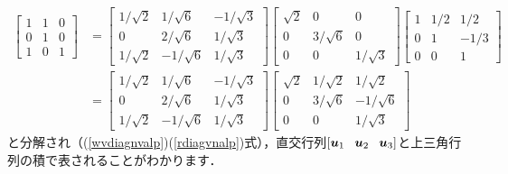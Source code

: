\documentclass[dvipdfmx]{jsarticle}
\theoremstyle{definition}
\newcommand{\hs}[1]{\hspace{#1em}}
\newcommand{\hv}[3]{[#1 \hs{0.8} #2 \hs{0.8} #3]}
\begin{document}
\begin{align}
    \begin{bmatrix}
        1 & 1 & 0 \\
        0 & 1 & 0 \\
        1 & 0 & 1
    \end{bmatrix}
    &= \begin{bmatrix}
        1/\sqrt{2} & 1/\sqrt{6} & -1/\sqrt{3} \\
        0 & 2/\sqrt{6} & 1/\sqrt{3} \\
        1/\sqrt{2} & -1/\sqrt{6} & 1/\sqrt{3}
    \end{bmatrix}
    \begin{bmatrix}
        \sqrt{2} & 0 & 0 \\
        0 & 3/\sqrt{6} & 0 \\
        0 & 0 & 1/\sqrt{3}
    \end{bmatrix}
    \begin{bmatrix}
        1 & 1/2 & 1/2 \\
        0 & 1 & -1/3 \\
        0 & 0 & 1
    \end{bmatrix} \\
    &= \begin{bmatrix}
        1/\sqrt{2} & 1/\sqrt{6} & -1/\sqrt{3} \\
        0 & 2/\sqrt{6} & 1/\sqrt{3} \\
        1/\sqrt{2} & -1/\sqrt{6} & 1/\sqrt{3}
    \end{bmatrix}
    \begin{bmatrix}
        \sqrt{2} & 1/\sqrt{2} & 1/\sqrt{2} \\
        0 & 3/\sqrt{6} & -1/\sqrt{6} \\
        0 & 0 & 1/\sqrt{3}
    \end{bmatrix}
\end{align}
と分解され（(\ref{wvdiagnvalp})(\ref{rdiagvnalp})式），直交行列$\hv{\bm{u}_1}{\bm{u}_2}{\bm{u}_3}$と上三角行列の積で表されることがわかります．


\end{document}

